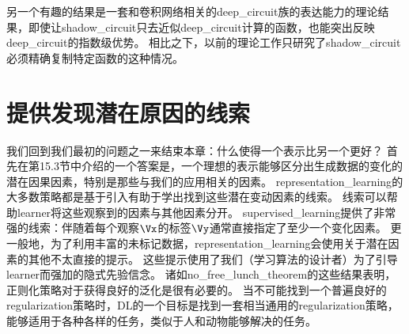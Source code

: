 另一个有趣的结果是一套和卷积网络相关的\gls{deep_circuit}族的表达能力的理论结果，即使让\gls{shadow_circuit}只去近似\gls{deep_circuit}计算的函数，也能突出反映\gls{deep_circuit}的指数级优势\citep{Cohen-et-al-arXiv2015}。
相比之下，以前的理论工作只研究了\gls{shadow_circuit}必须精确复制特定函数的这种情况。


\section{提供发现潜在原因的线索}
\label{sec:providing_clues_to_discover_underlying_causes}
我们回到我们最初的问题之一来结束本章：什么使得一个表示比另一个更好？
首先在第15.3节中介绍的一个答案是，一个理想的表示能够区分出生成数据的变化的潜在因果因素，特别是那些与我们的应用相关的因素。
\gls{representation_learning}的大多数策略都是基于引入有助于学出找到这些潜在变动因素的线索。
线索可以帮助\gls{learner}将这些观察到的因素与其他因素分开。
\gls{supervised_learning}提供了非常强的线索：伴随着每个观察$\Vx$的标签$\Vy$通常直接指定了至少一个变化因素。
更一般地，为了利用丰富的未标记数据，\gls{representation_learning}会使用关于潜在因素的其他不太直接的提示。
这些提示使用了我们（学习算法的设计者）为了引导\gls{learner}而强加的隐式先验信念。
诸如\gls{no_free_lunch_theorem}的这些结果表明，正则化策略对于获得良好的泛化是很有必要的。
当不可能找到一个普遍良好的\gls{regularization}策略时，\gls{DL}的一个目标是找到一套相当通用的\gls{regularization}策略，能够适用于各种各样的任务，类似于人和动物能够解决的任务。


